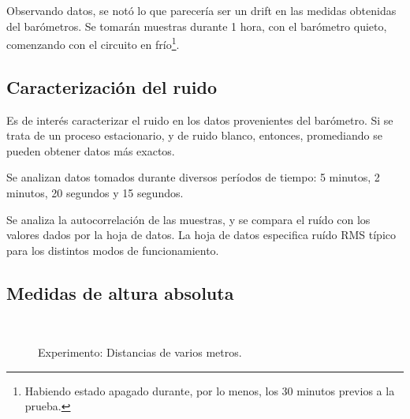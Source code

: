 \documentclass[spanish,12pt,a4paper,titlepage]{report}
\begin{document}
Observando datos, se notó lo que parecería ser un drift en las medidas obtenidas del barómetros. Se tomarán muestras durante 1 hora, con el barómetro quieto, comenzando con el circuito en frío\footnote{Habiendo estado apagado durante, por lo menos, los 30 minutos previos a la prueba.}.

\subsection{Caracterización del ruido}

Es de interés caracterizar el ruido en los datos provenientes del barómetro. Si se trata de un proceso estacionario, y de ruido blanco, entonces, promediando se pueden obtener datos más exactos.

Se analizan datos tomados durante diversos períodos de tiempo: 5 minutos, 2 minutos, 20 segundos y 15 segundos.

Se analiza la autocorrelación de las muestras, y se compara el ruído con los valores dados por la hoja de datos. La hoja de datos especifica ruído RMS típico para los distintos modos de funcionamiento.

\subsection{Medidas de altura absoluta}

\begin{figure}
\vspace{-70pt}
  \begin{center}
	\\
  \end{center}
  \caption{Experimento: Distancias de varios metros.}
\label{fig:escalera-fing}
\vspace{-40pt}
\end{figure}
\end{document}
